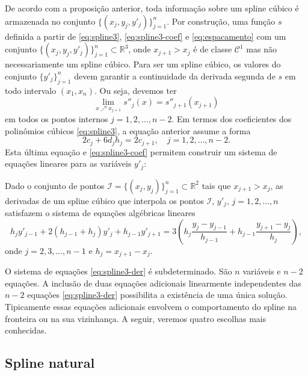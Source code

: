 De acordo com a proposição anterior, toda informação sobre um spline cúbico é armazenada no conjunto $\{(x_j,y_j,y'_j)\}_{j=1}^n$. Por construção, uma função $s$ definida a partir de \eqref{eq:spline3}, \eqref{eq:spline3-coef} e \eqref{eq:espacamento} com um conjunto $\{(x_j,y_j,y'_j)\}_{j=1}^n\subset\mathbb{R}^3$, onde $x_{j+1}>x_j$ é de classe $\mathcal{C}^1$ mas não necessariamente um spline cúbico. Para ser um spline cúbico, os valores do conjunto $\{y'_j\}_{j=1}^n$ devem garantir a continuidade da derivada segunda de $s$ em todo intervalo $(x_1,x_n)$. Ou seja, devemos ter
\begin{equation}
\lim\limits_{x\nearrow x_{j+1} }s''_j(x)=s''_{j+1}(x_{j+1})
\end{equation}
em todos os pontos internos $j=1,2,\ldots,n-2$.  Em termos dos coeficientes dos polinômios cúbicos \eqref{eq:spline3}, a equação anterior assume a forma
\begin{equation}
2c_j+6d_jh_j=2c_{j+1},\quad j=1,2,\ldots,n-2.
\end{equation}
Esta última equação e \eqref{eq:spline3-coef} permitem construir um sistema de equações lineares para as variáveis $y'_j$:
\begin{prop} Dado o conjunto de pontos $\mathcal{I}=\{(x_j,y_j)\}_{j=1}^n\subset\mathbb{R}^2$ tais que $x_{j+1}>x_j$, as derivadas de um spline cúbico que interpola os pontos $\mathcal{I}$, $y'_j$, $j=1,2,\ldots,n$ satisfazem o sistema de equações algébricas lineares
\begin{equation}\label{eq:spline3-der}
h_jy'_{j-1}+2(h_{j-1}+h_j)y'_j+h_{j-1}y'_{j+1}=3\left(h_j\dfrac{y_j-y_{j-1}}{h_{j-1}}+h_{j-1}\dfrac{y_{j+1}-y_j}{h_j}\right),
\end{equation}
onde $j=2,3,\ldots,n-1$ e $h_j=x_{j+1}-x_j$.
\end{prop}
O sistema de equações \eqref{eq:spline3-der} é subdeterminado. São $n$ variáveis e $n-2$ equações. A inclusão de duas equações adicionais linearmente independentes das $n-2$ equações \eqref{eq:spline3-der} possibilita a existência de uma única solução. Tipicamente essas equações adicionais envolvem o comportamento do spline na fronteira ou na sua vizinhança.  A seguir, veremos quatro escolhas mais conhecidas.


\subsection{Spline natural}

